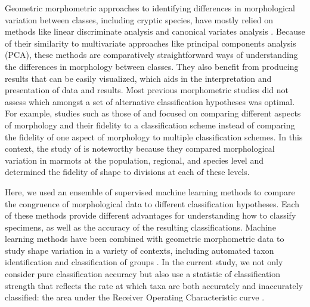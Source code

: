 \documentclass[fleqn,10pt,lineno]{wlpeerj} %
\begin{document}
Geometric morphometric approaches to identifying differences in morphological variation between classes, including cryptic species, have mostly relied on methods like linear discriminate analysis and canonical variates analysis \citep{Polly2003,Zelditch2004,Gaubert2005b,Gunduz2007,Polly2007a,Francoy2009,Sztencel-Jabonka2009,Edwards2011,MitrovskiBogdanovic2013,Dillard2017}. Because of their similarity to multivariate approaches like principal components analysis (PCA), these methods are comparatively straightforward ways of understanding the differences in morphology between classes. They also benefit from producing results that can be easily visualized, which aids in the interpretation and presentation of data and results. Most previous morphometric studies did not assess which amongst a set of alternative classification hypotheses was optimal. For example, studies such as those of \citet{Caumul2005a} and \citet{Polly2007a} focused on comparing different aspects of morphology and their fidelity to a classification scheme instead of comparing the fidelity of one aspect of morphology to multiple classification schemes. In this context, the study of \citet{Cardini2009a} is noteworthy because they compared morphological variation in marmots at the population, regional, and species level and determined the fidelity of shape to divisions at each of these levels.

Here, we used an ensemble of supervised machine learning methods to compare the congruence of morphological data to different classification hypotheses. Each of these methods provide different advantages for understanding how to classify specimens, as well as the accuracy of the resulting classifications. 
Machine learning methods have been combined with geometric morphometric data to study shape variation in a variety of contexts, including automated taxon identification and classification of groups \citep{Baylac2003,Dobigny2003,MacLeod2007,VanBocxlaer2010,VandenBrink2011,Navega2015}. %
In the current study, we not only consider pure classification accuracy but also use a statistic of classification strength that reflects the rate at which taxa are both accurately and inaccurately classified: the area under the Receiver Operating Characteristic curve \citep{Hastie2009}. 
\end{document}
